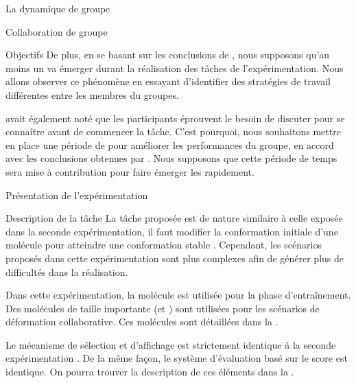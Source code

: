 \documentclass[myfrancais,ngerman,english,french]{mythesis}
\begin{document}
\begin{mychapter}{La dynamique de groupe}
\begin{mysection}{Collaboration de groupe}
\begin{mysubsection}{Objectifs}
				De plus, en se basant sur les conclusions de , nous supposons qu'au moins un  va émerger durant la réalisation des tâches de l'expérimentation.
				Nous allons observer ce phénomène en essayant d'identifier des stratégies de travail différentes entre les membres du groupes.

				 avait également noté que les participants éprouvent le besoin de discuter pour se connaître avant de commencer la tâche.
				C'est pourquoi, nous souhaitons mettre en place une période de \mybrainstorming pour améliorer les performances du groupe, en accord avec les conclusions obtenues par .
				Nous supposons que cette période de temps sera mise à contribution pour faire émerger les  rapidement.
			\end{mysubsection}
		\end{mysection}
		\begin{mysection}{Présentation de l'expérimentation}
			\begin{mysubsection}{Description de la tâche}
				La tâche proposée est de nature similaire à celle exposée dans la seconde expérimentation, il faut modifier la conformation initiale d'une molécule pour atteindre une conformation stable .
				Cependant, les scénarios proposés dans cette expérimentation sont plus complexes afin de générer plus de difficultés dans la réalisation.

				Dans cette expérimentation, la molécule \myTRPCAGE est utilisée pour la phase d'entraînement.
				Des molécules de taille importante (\myPrion et \myUbiquitin) sont utilisées pour les scénarios de déformation collaborative.
				Ces molécules sont détaillées dans la .

				Le mécanisme de sélection et d'affichage est strictement identique à la seconde expérimentation .
				De la même façon, le système d'évaluation basé sur le score  est identique.
				On pourra trouver la description de ces éléments dans la .


\end{mysubsection}
\end{mysection}
\end{mychapter}
\end{document}
